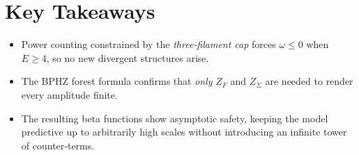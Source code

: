 \documentclass[12pt]{article}
\begin{document}
\section*{Key Takeaways}
\begin{itemize}
  \item Power counting constrained by the \emph{three‐filament cap} forces $\omega\le 0$ when $E\ge4$, so no new divergent structures arise.  
  \item The BPHZ forest formula confirms that \emph{only} $Z_F$ and $Z_{\Sigma}$ are needed to render every amplitude finite.  
  \item The resulting beta functions show asymptotic safety, keeping the model predictive up to arbitrarily high scales without introducing an infinite tower of counter‐terms.
\end{itemize}
\end{document}
